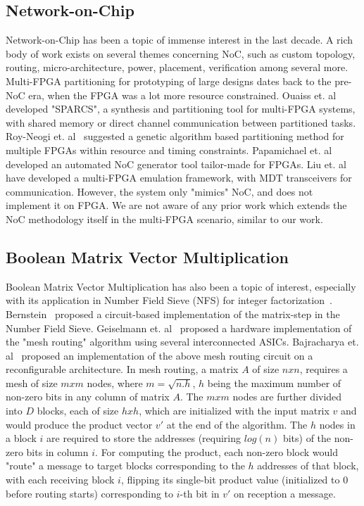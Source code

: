 \documentclass[conference, 9pt]{IEEEtran}
\begin{document}
\subsection{Network-on-Chip}

Network-on-Chip has been a topic of immense interest in the last decade. A rich 
body of work exists on several themes concerning NoC, such as custom topology, 
routing, micro-architecture, power, placement, verification among several more. 
Multi-FPGA partitioning for prototyping of large designs dates back to the 
pre-NoC era, when the FPGA was a lot more resource constrained. Ouaiss et. 
al~\cite{ouaiss1998integrated} developed "SPARCS", a synthesis and partitioning 
tool for multi-FPGA systems, with shared memory or direct channel communication 
between partitioned tasks. Roy-Neogi et. al~\cite{roy1995multiple} suggested a 
genetic algorithm based partitioning method for multiple FPGAs within resource 
and timing constraints. Papamichael et. al~\cite{papamichael2012connect} 
developed an automated NoC generator tool tailor-made for FPGAs. Liu et. 
al~\cite{liu2010building} have developed a multi-FPGA emulation framework, with 
MDT transceivers for communication. However, the system only "mimics" NoC, and 
does not 
implement it on FPGA. We are not aware of any prior work which extends the NoC 
methodology itself in the multi-FPGA scenario, similar to our work. \\

\subsection{Boolean Matrix Vector Multiplication}

Boolean Matrix Vector Multiplication has also been a topic of interest, 
especially with its application in Number Field Sieve (NFS) for integer 
factorization~\cite{lenstra1990number}. Bernstein~\cite{bernstein2001circuits} 
proposed a circuit-based implementation of the matrix-step in the Number Field 
Sieve. Geiselmann et. al~\cite{geiselmann2003hardware} proposed a hardware 
implementation of the "mesh routing" algorithm using several interconnected 
ASICs. Bajracharya et. al~\cite{bajracharya2004reconfigurable} proposed an 
implementation of the above mesh routing circuit on a reconfigurable 
architecture. In mesh routing, a matrix $A$ of size $nxn$, requires a mesh of 
size $mxm$ nodes, where $m = \sqrt{n.h}$, $h$ being the maximum number of 
non-zero bits in any column of matrix $A$.  The $mxm$ nodes are further divided 
into $D$ blocks, each of size $hxh$, which are initialized with the input matrix 
$v$ and would produce the product vector $v'$ at the end of the algorithm. The 
$h$ nodes in a block $i$ are 
required to store the addresses (requiring $log(n)$ bits) of the non-zero bits 
in column $i$. For computing the product, each non-zero block would "route" a 
message to target blocks corresponding to the $h$ addresses of that block, with 
each receiving block $i$, flipping its single-bit product value (initialized to 
0 before routing starts) corresponding to $i$-th bit in $v'$ on reception a 
message. \\
\end{document}
